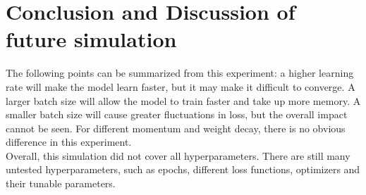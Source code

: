 \documentclass[12pt]{article}
\begin{document}
\section{Conclusion and Discussion of future simulation}
The following points can be summarized from this experiment: a higher learning rate will make the model learn faster, but it may make it difficult to converge. A larger batch size will allow the model to train faster and take up more memory. A smaller batch size will cause greater fluctuations in loss, but the overall impact cannot be seen. For different momentum and weight decay, there is no obvious difference in this experiment. \\
Overall, this simulation did not cover all hyperparameters. There are still many untested hyperparameters, such as epochs, different loss functions, optimizers and their tunable parameters.




\end{document}
